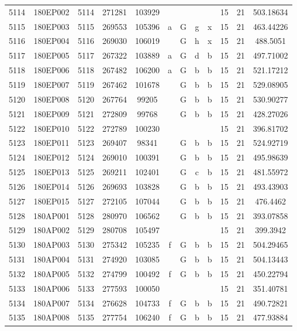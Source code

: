 \begin{tabular}{|*{12}{c|}}
5114 & 180EP002 & 5114 & 271281 & 103929 &  &  &  &  & 15 & 21 & 503.18634 \\ 
5115 & 180EP003 & 5115 & 269553 & 105396 & a & G & g & x & 15 & 21 & 463.44226 \\ 
5116 & 180EP004 & 5116 & 269030 & 106019 &  & G & h & x & 15 & 21 & 488.5051 \\ 
5117 & 180EP005 & 5117 & 267322 & 103889 & a & G & d & b & 15 & 21 & 497.71002 \\ 
5118 & 180EP006 & 5118 & 267482 & 106200 & a & G & b & b & 15 & 21 & 521.17212 \\ 
5119 & 180EP007 & 5119 & 267462 & 101678 &  & G & b & b & 15 & 21 & 529.08905 \\ 
5120 & 180EP008 & 5120 & 267764 & 99205 &  & G & b & b & 15 & 21 & 530.90277 \\ 
5121 & 180EP009 & 5121 & 272809 & 99768 &  & G & b & b & 15 & 21 & 428.27026 \\ 
5122 & 180EP010 & 5122 & 272789 & 100230 &  &  &  &  & 15 & 21 & 396.81702 \\ 
5123 & 180EP011 & 5123 & 269407 & 98341 &  & G & b & b & 15 & 21 & 524.92719 \\ 
5124 & 180EP012 & 5124 & 269010 & 100391 &  & G & b & b & 15 & 21 & 495.98639 \\ 
5125 & 180EP013 & 5125 & 269211 & 102401 &  & G & c & b & 15 & 21 & 481.55972 \\ 
5126 & 180EP014 & 5126 & 269693 & 103828 &  & G & b & b & 15 & 21 & 493.43903 \\ 
5127 & 180EP015 & 5127 & 272105 & 107044 &  & G & b & b & 15 & 21 & 476.4462 \\ 
5128 & 180AP001 & 5128 & 280970 & 106562 &  & G & b & b & 15 & 21 & 393.07858 \\ 
5129 & 180AP002 & 5129 & 280708 & 105497 &  &  &  &  & 15 & 21 & 399.3942 \\ 
5130 & 180AP003 & 5130 & 275342 & 105235 & f & G & b & b & 15 & 21 & 504.29465 \\ 
5131 & 180AP004 & 5131 & 274920 & 103085 &  & G & b & b & 15 & 21 & 504.13443 \\ 
5132 & 180AP005 & 5132 & 274799 & 100492 & f & G & b & b & 15 & 21 & 450.22794 \\ 
5133 & 180AP006 & 5133 & 277593 & 100050 &  &  &  &  & 15 & 21 & 351.40781 \\ 
5134 & 180AP007 & 5134 & 276628 & 104733 & f & G & b & b & 15 & 21 & 490.72821 \\ 
5135 & 180AP008 & 5135 & 277754 & 106240 & f & G & b & b & 15 & 21 & 477.93884 \\ 

\end{tabular}
